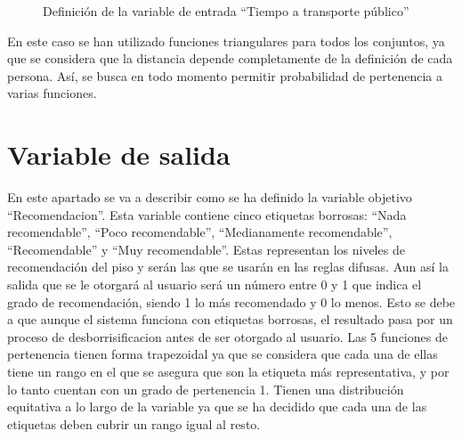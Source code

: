 \documentclass[12pt]{report} %
\begin{document}
        \begin{figure}[H]
            \centering
            \caption{Definición de la variable de entrada ``Tiempo a transporte público''}
        \end{figure}

        En este caso se han utilizado funciones triangulares para todos los conjuntos, ya que se considera que la distancia
         depende completamente de la definición de cada persona. Así, se busca en todo momento permitir probabilidad de 
        pertenencia a varias funciones. 

    \section{Variable de salida}
    En este apartado se va a describir como se ha definido la variable objetivo
    ``Recomendacion''. Esta variable contiene cinco etiquetas borrosas: ``Nada
    recomendable'', ``Poco recomendable'', ``Medianamente recomendable'',
    ``Recomendable'' y ``Muy recomendable''. Estas representan los niveles de
    recomendación del piso y serán las que se usarán en las reglas difusas. Aun
    así la salida que se le otorgará al usuario será un número entre 0 y 1 que
    indica el grado de recomendación, siendo 1 lo más recomendado y 0 lo menos.
    Esto se debe a que aunque el sistema funciona con etiquetas borrosas, el
    resultado pasa por un proceso de desborrisificacion antes de ser otorgado al
    usuario. Las 5 funciones de pertenencia tienen forma trapezoidal ya que se
    considera que cada una de ellas tiene un rango en el que se asegura que
    son la etiqueta más representativa, y por lo tanto cuentan con un grado de pertenencia 1.
    Tienen una distribución equitativa a lo largo de la variable ya que
    se ha decidido que cada una de las etiquetas deben cubrir un rango igual al
    resto.
\end{document}
